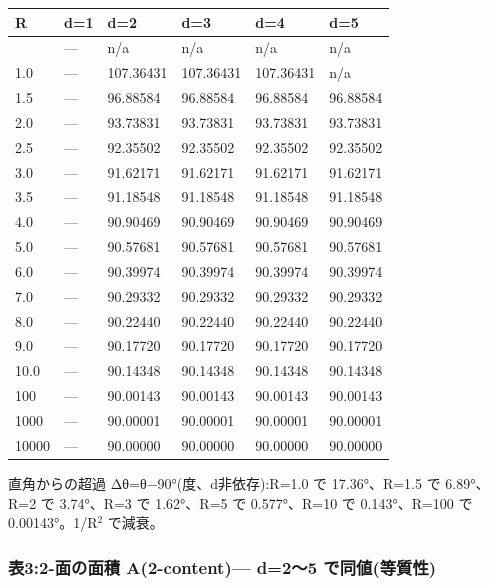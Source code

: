 \documentclass[
]{ltjsarticle}
\newcounter{none} %
\begin{document}
{\def\LTcaptype{none} %
\begin{longtable}[]{@{}llllll@{}}
\toprule\noalign{}
R & d=1 & d=2 & d=3 & d=4 & d=5 \\
\midrule\noalign{}
\endhead
\bottomrule\noalign{}
\endlastfoot
0.5 & --- & n/a & n/a & n/a & n/a \\
1.0 & --- & 107.36431 & 107.36431 & 107.36431 & n/a \\
1.5 & --- & 96.88584 & 96.88584 & 96.88584 & 96.88584 \\
2.0 & --- & 93.73831 & 93.73831 & 93.73831 & 93.73831 \\
2.5 & --- & 92.35502 & 92.35502 & 92.35502 & 92.35502 \\
3.0 & --- & 91.62171 & 91.62171 & 91.62171 & 91.62171 \\
3.5 & --- & 91.18548 & 91.18548 & 91.18548 & 91.18548 \\
4.0 & --- & 90.90469 & 90.90469 & 90.90469 & 90.90469 \\
5.0 & --- & 90.57681 & 90.57681 & 90.57681 & 90.57681 \\
6.0 & --- & 90.39974 & 90.39974 & 90.39974 & 90.39974 \\
7.0 & --- & 90.29332 & 90.29332 & 90.29332 & 90.29332 \\
8.0 & --- & 90.22440 & 90.22440 & 90.22440 & 90.22440 \\
9.0 & --- & 90.17720 & 90.17720 & 90.17720 & 90.17720 \\
10.0 & --- & 90.14348 & 90.14348 & 90.14348 & 90.14348 \\
100 & --- & 90.00143 & 90.00143 & 90.00143 & 90.00143 \\
1000 & --- & 90.00001 & 90.00001 & 90.00001 & 90.00001 \\
10000 & --- & 90.00000 & 90.00000 & 90.00000 & 90.00000 \\
\end{longtable}
}

直角からの超過 Δθ=θ−90°(度、d非依存):R=1.0 で 17.36°、R=1.5 で
6.89°、R=2 で 3.74°、R=3 で 1.62°、R=5 で 0.577°、R=10 で 0.143°、R=100
で 0.00143°。1/R\(^{2}\) で減衰。

\subsubsection{表3:2-面の面積 A(2-content)--- d=2〜5
で同値(等質性)}\label{ux886832-ux9762ux306eux9762ux7a4d-a2-content-d25-ux3067ux540cux5024ux7b49ux8ceaux6027}
\end{document}
